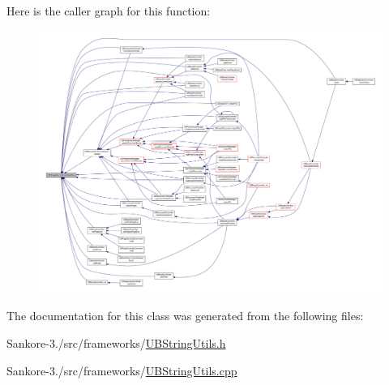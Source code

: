 Here is the caller graph for this function\-:
\nopagebreak
\begin{figure}[H]
\begin{center}
\leavevmode
\includegraphics[width=350pt]{dc/d4c/class_u_b_string_utils_aca5c79d1ca00f4ecbf5e014b7d9810a6_icgraph}
\end{center}
\end{figure}




The documentation for this class was generated from the following files\-:\begin{DoxyCompactItemize}
\item 
Sankore-\/3./src/frameworks/\hyperlink{_u_b_string_utils_8h}{U\-B\-String\-Utils.\-h}\item 
Sankore-\/3./src/frameworks/\hyperlink{_u_b_string_utils_8cpp}{U\-B\-String\-Utils.\-cpp}\end{DoxyCompactItemize}
